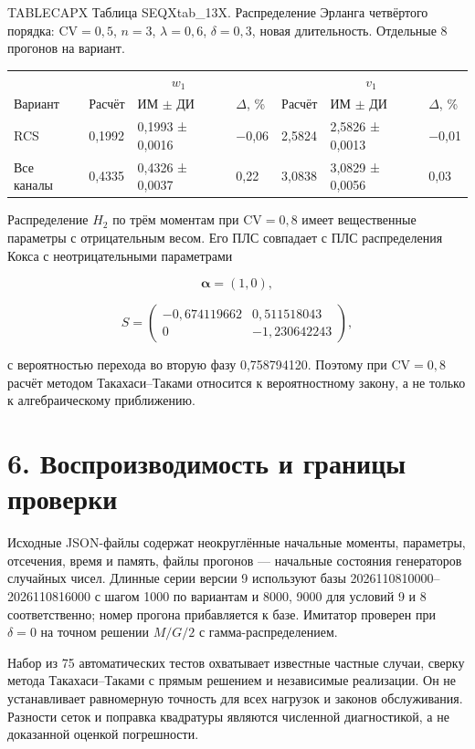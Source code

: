 \noindent TABLECAPX Таблица SEQXtab_13X. Распределение Эрланга четвёртого порядка: \(\mathrm{CV}=0{,}5\), \(n=3\), \(\lambda=0{,}6\), \(\delta=0{,}3\), новая длительность. Отдельные 8 прогонов на вариант.\par

\setlength{\tabcolsep}{2pt}
\begin{tabular}{p{4.16cm}p{1.61cm}p{2.83cm}p{1.28cm}p{1.61cm}p{2.83cm}p{1.28cm}}
\toprule
 & \multicolumn{3}{c}{$w_1$} & \multicolumn{3}{c}{$v_1$} \\
Вариант & Расчёт & ИМ $\pm$ ДИ & $\Delta$, \% & Расчёт & ИМ $\pm$ ДИ & $\Delta$, \% \\
\midrule
RCS & 0,1992 & 0,1993 ± 0,0016 & −0,06 & 2,5824 & 2,5826 ± 0,0013 & −0,01 \\
Все каналы & 0,4335 & 0,4326 ± 0,0037 & 0,22 & 3,0838 & 3,0829 ± 0,0056 & 0,03 \\
\bottomrule
\end{tabular}




Распределение \(H_2\) по трём моментам при \(\mathrm{CV}=0{,}8\) имеет вещественные параметры с отрицательным весом. Его ПЛС совпадает с ПЛС распределения Кокса с неотрицательными параметрами


\[\boldsymbol\alpha=(1,0),\]

\[S=\begin{pmatrix}-0{,}674119662&0{,}511518043\\0&-1{,}230642243\end{pmatrix},\]


с вероятностью перехода во вторую фазу 0{,}758794120. Поэтому при \(\mathrm{CV}=0{,}8\) расчёт методом Такахаси--Таками относится к вероятностному закону, а не только к алгебраическому приближению.

\section*{6. Воспроизводимость и границы проверки}
Исходные JSON-файлы содержат неокруглённые начальные моменты, параметры, отсечения, время и память, файлы прогонов --- начальные состояния генераторов случайных чисел. Длинные серии версии 9 используют базы 2026110810000--2026110816000 с шагом 1000 по вариантам и 8000, 9000 для условий 9 и 8 соответственно; номер прогона прибавляется к базе. Имитатор проверен при \(\delta=0\) на точном решении \(M/G/2\) с гамма-распределением.

Набор из 75 автоматических тестов охватывает известные частные случаи, сверку метода Такахаси--Таками с прямым решением и независимые реализации. Он не устанавливает равномерную точность для всех нагрузок и законов обслуживания. Разности сеток и поправка квадратуры являются численной диагностикой, а не доказанной оценкой погрешности.

